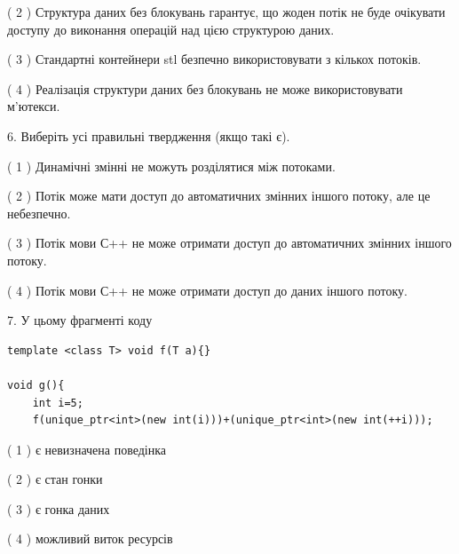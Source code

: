 \documentclass[12pt, ukrainian]{article}
\begin{document}
\begin {large}
{( 2 ) Структура даних без блокувань гарантує, що жоден потік не буде очікувати доступу до виконання операцій над цією структурою даних.%

( 3 ) Стандартні контейнери stl безпечно використовувати з кількох потоків.%

( 4 ) Реалізація структури даних без блокувань не може використовувати м’ютекси.%
\newpage



\vspace{5mm}
6. Виберіть усі правильні твердження (якщо такі є).\par
\vspace{2mm}

( 1 ) Динамічні змінні не можуть розділятися між потоками.%

( 2 ) Потік може мати доступ до автоматичних змінних іншого потоку, але це небезпечно.%

( 3 ) Потік мови С++ не може отримати доступ до автоматичних змінних іншого потоку.%

( 4 ) Потік мови С++ не може отримати доступ до даних іншого потоку.%


\vspace{5mm}
7. У цьому фрагменті коду
\begin{verbatim}
template <class T> void f(T a){}

void g(){
    int i=5;
    f(unique_ptr<int>(new int(i)))+(unique_ptr<int>(new int(++i)));
\end{verbatim}
( 1 ) є невизначена поведінка%

( 2 ) є стан гонки%

( 3 ) є гонка даних%

( 4 ) можливий виток ресурсів%
}
\end {large}
\end{document}
